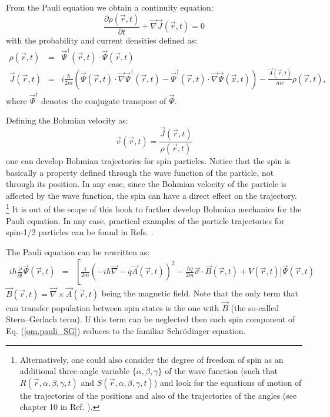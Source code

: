 \documentclass[nofootinbib, secnumarabic, amsmath, nobibnotes,11pt,aps,pra, floatfix]{revtex4-1}
\newcommand{\eref}[1]{Eq. (\ref{#1})}
\begin{document}
From the Pauli equation we obtain a continuity equation:
\begin{equation}
\label{om.difcurrent_density_pauli}
\frac{\partial\rho(\vec{r},t)}{\partial t} + \vec{\nabla} \vec{J}(\vec{r},t) = 0
\end{equation}
with the probability and current densities defined as:
\begin{eqnarray}
\label{om.rhospin}
\rho(\vec r,t) & = & \vec \Psi^{\dagger}(\vec{r},t)\cdot\vec \Psi(\vec{r},t) \\
\label{om.currentspin}
\vec J(\vec{r},t) & = & i \frac {\hbar} {2 m}
\left(\vec\Psi(\vec{r},t)\cdot {\vec{\nabla} \vec
\Psi^{\dagger}(\vec{r},t)} - \vec\Psi^{\dagger}(\vec{r},t) \cdot
{\vec{\nabla} \vec \Psi(\vec{x},t)} \right)-\frac {\vec A(\vec r,t)} {mc} \rho(\vec r,t),
\end{eqnarray}
where $\vec\Psi^{\dagger}$ denotes the conjugate transpose of $\vec\Psi$.

Defining the Bohmian velocity as:
\begin{equation}
\vec v(\vec r,t) = \frac{ \vec{J}(\vec{r},t)}{\rho(\vec r,t)}
\end{equation}
one can develop Bohmian trajectories for spin particles. Notice that the spin is basically a property defined through the wave function of the particle, not through its position. In any case, since the Bohmian velocity of the particle is affected by the wave function, the spin can have a direct effect on the trajectory. \footnote{Alternatively, one could also consider the degree of freedom of spin as an additional three-angle variable $\{\alpha,\beta,\gamma\}$ of the wave function (such that $R(\vec r,\alpha,\beta,\gamma,t)$ and $S(\vec r,\alpha,\beta,\gamma,t)$) and look for the equations of motion of the trajectories of the positions and also of the trajectories of the angles (see chapter 10 in Ref. \cite{om.Holand1993}).} It is out of the scope of this book to further develop Bohmian mechanics for the Pauli equation.
In any case, practical examples of the particle trajectories for spin-1/2 particles can be found in Refs. \cite{om.Holland2003,om.colijn2002}.

The Pauli equation can be rewritten as:
\begin{eqnarray}
\label{om.pauli_SG}
i \hbar \frac{ \partial}{\partial t} \vec \Psi(\vec r,t) &=&
\left[ \frac{1}{2m} \left(- i \hbar \vec{\nabla} - q \vec{A}(\vec r,t)\right) ^2 -\frac{\hbar q}{2m} \vec{\sigma}\cdot\vec{B}(\vec r,t)\right.+ V(\vec r,t) \bigg]\vec \Psi(\vec r,t)
\end{eqnarray}
$\vec{B}(\vec r,t) = \vec{\nabla} \times \vec{A}(\vec r,t)$ being
the magnetic field. Note that the only term that can transfer
population between spin states is the one with $\vec{B}$ (the
so-called Stern--Gerlach term). If this term can be neglected then
each spin component of \eref{om.pauli_SG} reduces to the familiar
Schr\"odinger equation. 
\end{document}
